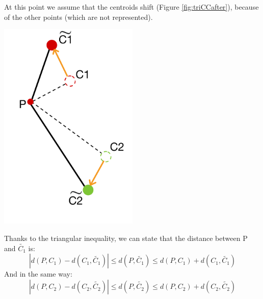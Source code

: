 \documentclass{report}
\begin{document}
\begin{minipage}[b]{0.48\textwidth}
        At this point we assume that the centroids shift (Figure \ref{fig:triCCafter}), because of the other points (which are not represented).

        \vspace{0.1in}
        \begin{center}
            \includegraphics[width = 0.5\textwidth]{imgs/triCCAfter.png}
            \label{fig:triCCafter}
        \end{center}   

        Thanks to the triangular inequality, we can state that the distance between P and $\tilde{C_1}$ is:
        \begin{equation*}
          |d(P, C_1) - d(C_1, \tilde{C_1})| \leq d(P, \tilde{C_1}) \leq d(P, C_1) + d(C_1, \tilde{C_1})
        \end{equation*}
        And in the same way:
        \begin{equation*}
          |d(P, C_2) - d(C_2, \tilde{C_2})| \leq d(P, \tilde{C_2}) \leq d(P, C_2) + d(C_2, \tilde{C_2})
        \end{equation*}
\end{minipage}
\hspace{0.1in}
\end{document}
